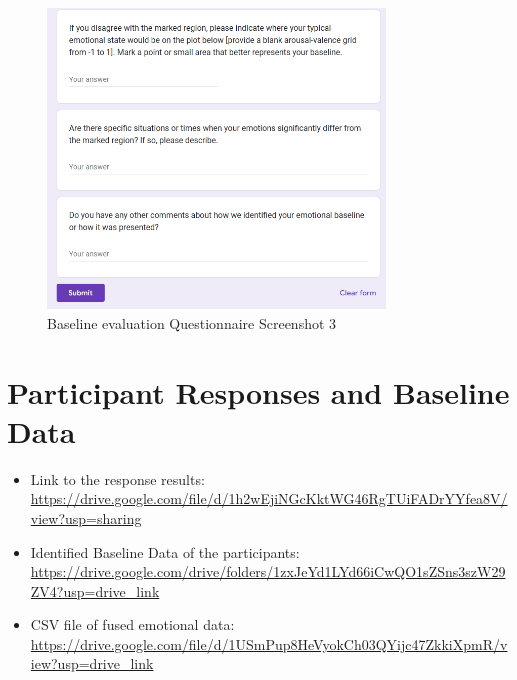 \begin{figure}[H]
    \centering
    \includegraphics[width=0.8\textwidth]{appendix/imgs/bq3.png}
    \caption{Baseline evaluation Questionnaire Screenshot 3}
\end{figure}

\section*{Participant Responses and Baseline Data} 

\begin{itemize}
    \item Link to the response results: \url{https://drive.google.com/file/d/1h2wEjiNGcKktWG46RgTUiFADrYYfea8V/view?usp=sharing}
    \item Identified Baseline Data of the participants: \url{https://drive.google.com/drive/folders/1zxJeYd1LYd66iCwQO1sZSns3szW29ZV4?usp=drive_link}
    \item CSV file of fused emotional data: \url{https://drive.google.com/file/d/1USmPup8HeVyokCh03QYijc47ZkkiXpmR/view?usp=drive_link}
\end{itemize}


